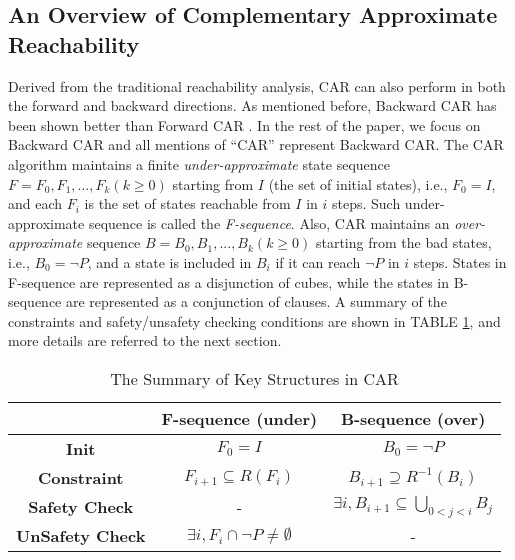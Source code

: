 \subsection{An Overview of Complementary Approximate Reachability}

Derived from the traditional reachability analysis, CAR can also perform in both the forward and backward directions. 
As mentioned before, Backward CAR has been shown better than Forward CAR \cite{}. In the rest of the paper, we focus on Backward CAR and all mentions of ``CAR'' represent Backward CAR. 
The CAR algorithm maintains a finite \emph{under-approximate} state sequence $F=F_{0},F_{1},...,F_{k} (k\geq 0)$  starting from $I$  (the set of initial states), i.e., $F_{0}=I$,  and each $F_{i}$ is the set of states reachable from $I$ in $i$ steps. Such under-approximate sequence is called the \emph{F-sequence}. Also, CAR maintains an \emph{over-approximate} sequence $B = B_{0},B_{1},...,B_{k} (k\geq 0)$ starting from the bad states, i.e., $B_{0}=\neg P$, and a state is included in $B_{i}$ if it can reach $\neg P$ in $i$ steps. States in F-sequence are represented as a disjunction of cubes, while the states in B-sequence are represented as a conjunction of clauses. A summary of the constraints and safety/unsafety checking conditions are shown in TABLE \ref{tab:car}, and more details are referred to the next section.

\begin{table}
\caption{The Summary of Key Structures in CAR}\label{tab:car}
\begin{tabular}{|c|c|c|} %
\hline 
&\textbf{F-sequence (under)}&\textbf{B-sequence (over)}\\
\hline  
\textbf{Init}&$F_{0}=I$&$B_{0}=\neg P$\\
\hline
\textbf{Constraint}&$F_{i+1}\subseteq R(F_{i})$&$B_{i+1}\supseteq R^{-1}(B_{i})$ \\
\hline
\textbf{Safety Check}&-&$\exists i, B_{i+1}\subseteq \bigcup_{0<j<i}B_{j}$ \\
\hline
\textbf{UnSafety Check}&$\exists i,F_{i}\cap \neg P \neq \emptyset$&- \\
\hline
\end{tabular}
\end{table}


